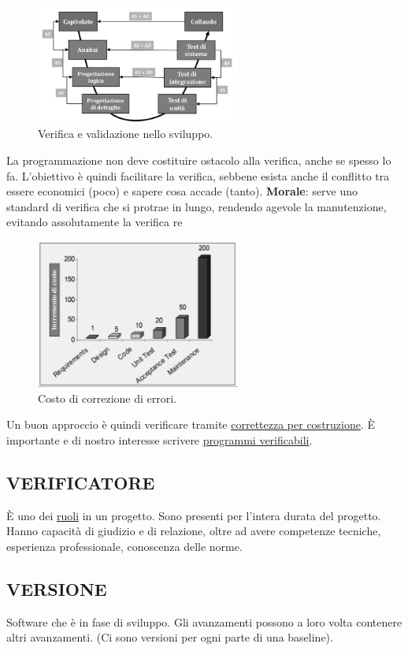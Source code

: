 		\begin{figure}[H]
			\centering
			\includegraphics[width=0.6\textwidth]{img/v}		
			\caption{Verifica e validazione nello sviluppo.}
			\label{V}
		\end{figure} 	
		La programmazione non deve costituire ostacolo alla verifica, anche se spesso lo fa. L'obiettivo è quindi facilitare la verifica, sebbene esista anche il conflitto tra essere economici (poco) e sapere cosa accade (tanto).
		\textbf{Morale}: serve uno standard di verifica che si protrae in lungo, rendendo agevole la manutenzione, evitando assolutamente la verifica re%
		
		\begin{figure}[H]
			\centering
			\includegraphics[width=0.6\textwidth]{img/costi}		
			\caption{Costo di correzione di errori.}
		\end{figure} 
		
		Un buon approccio è quindi verificare tramite \underline{\hyperref[byconstruction]{correttezza per costruzione}}. È importante e di nostro interesse scrivere \underline{\hyperref[programmiverificabili]{programmi verificabili}}.
			
		
		\subsection{VERIFICATORE}  \label{verificatore}
		È uno dei \underline{\hyperref[ruoli]{ruoli}} in un progetto. Sono presenti per l’intera durata del progetto. Hanno capacità di giudizio e di relazione, oltre ad avere competenze tecniche, esperienza professionale, conoscenza	delle norme.
		
		\subsection{VERSIONE}  \label{versione}
		Software che è in fase di sviluppo. Gli avanzamenti possono a loro volta contenere altri avanzamenti. (Ci sono versioni per ogni parte di una baseline). 
	
	
